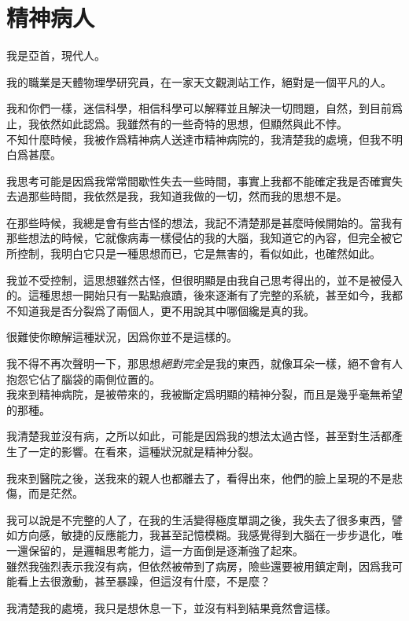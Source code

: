 \chapter{精神病人}
我是亞首，現代人。

我的職業是天體物理學研究員，在一家天文觀測站工作，絕對是一個平凡的人。

我和你們一樣，迷信科學，相信科學可以解釋並且解決一切問題，自然，到目前爲止，我依然如此認爲。我雖然有的一些奇特的思想，但顯然與此不悖。
\\


不知什麼時候，我被作爲精神病人送達市精神病院的，我清楚我的處境，但我不明白爲甚麼。

我思考可能是因爲我常常間歇性失去一些時間，事實上我都不能確定我是否確實失去過那些時間，我依然是我，我知道我做的一切，然而我的思想不是。

在那些時候，我總是會有些古怪的想法，我記不清楚那是甚麼時候開始的。當我有那些想法的時候，它就像病毒一樣侵佔的我的大腦，我知道它的內容，但完全被它所控制，我明白它只是一種思想而已，它是無害的，看似如此，也確然如此。

我並不受控制，這思想雖然古怪，但很明顯是由我自己思考得出的，並不是被侵入的。這種思想一開始只有一點點痕蹟，後來逐漸有了完整的系統，甚至如今，我都不知道我是否分裂爲了兩個人，更不用說其中哪個纔是真的我。

很難使你瞭解這種狀況，因爲你並不是這樣的。

我不得不再次聲明一下，那思想\emph{絕對完全}是我的東西，就像耳朵一樣，絕不會有人抱怨它佔了腦袋的兩側位置的。
\\


我來到精神病院，是被帶來的，我被斷定爲明顯的精神分裂，而且是幾乎毫無希望的那種。

我清楚我並沒有病，之所以如此，可能是因爲我的想法太過古怪，甚至對生活都產生了一定的影響。在看來，這種狀況就是精神分裂。

我來到醫院之後，送我來的親人也都離去了，看得出來，他們的臉上呈現的不是悲傷，而是茫然。

我可以說是不完整的人了，在我的生活變得極度單調之後，我失去了很多東西，譬如方向感，敏捷的反應能力，我甚至記憶模糊。我感覺得到大腦在一步步退化，唯一還保留的，是邏輯思考能力，這一方面倒是逐漸強了起來。
\\


雖然我強烈表示我沒有病，但依然被帶到了病房，險些還要被用鎮定劑，因爲我可能看上去很激動，甚至暴躁，但這沒有什麼，不是麼？

我清楚我的處境，我只是想休息一下，並沒有料到結果竟然會這樣。

